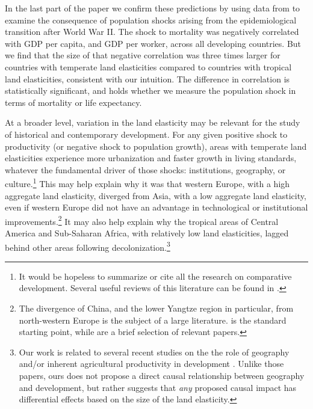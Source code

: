 \documentclass[11pt]{article}
\begin{document}
In the last part of the paper we confirm these predictions by using data from \cite{aj07} to examine the consequence of population shocks arising from the epidemiological transition after World War II. The shock to mortality was negatively correlated with GDP per capita, and GDP per worker, across all developing countries. But we find that the size of that negative correlation was three times larger for countries with temperate land elasticities compared to countries with tropical land elasticities, consistent with our intuition. The difference in correlation is statistically significant, and holds whether we measure the population shock in terms of mortality or life expectancy.

At a broader level, variation in the land elasticity may be relevant for the study of historical and contemporary development. For any given positive shock to productivity (or negative shock to population growth), areas with temperate land elasticities experience more urbanization and faster growth in living standards, whatever the fundamental driver of those shocks: institutions, geography, or culture.\footnote{It would be hopeless to summarize or cite all the research on comparative development. Several useful reviews of this literature can be found in \cite{ajr2005handbook,nunn_2009,Galor:2011uq,sw2013,vries2013}.} This may help explain why it was that western Europe, with a high aggregate land elasticity, diverged from Asia, with a low aggregate land elasticity, even if western Europe did not have an advantage in technological or institutional improvements.\footnote{The divergence of China, and the lower Yangtze region in particular, from north-western Europe is the subject of a large literature. \citet{pom2000} is the standard starting point, while \citet{allen11,huang2002,ma2013,lee2002,bg2006} are a brief selection of relevant papers.} It may also help explain why the tropical areas of Central America and Sub-Saharan Africa, with relatively low land elasticities, lagged behind other areas following decolonization.\footnote{Our work is related to several recent studies on the the role of geography and/or inherent agricultural productivity in development \citep{oh2005,ashraf2010dynamics,Nunn2011,Nunn2012,mich2012,agn2013,cook14,cook2014role,fenske2014,alsan2015,ashrafmich2015,dks2015,galorozak2016,litina2016,ads2016,FrankemaPap2017}. Unlike those papers, ours does not propose a direct causal relationship between geography and development, but rather suggests that \textit{any} proposed causal impact has differential effects based on the size of the land elasticity.} 
\end{document}
